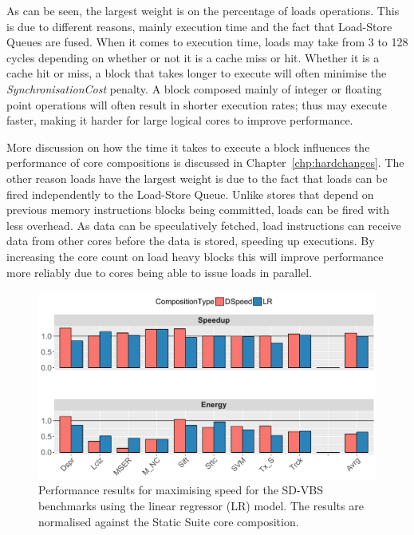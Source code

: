 As can be seen, the largest weight is on the percentage of loads operations.
This is due to different reasons, mainly execution time and the fact that Load-Store Queues are fused.
When it comes to execution time, loads may take from 3 to 128 cycles depending on whether or not it is a cache miss or hit.
Whether it is a cache hit or miss, a block that takes longer to execute will often minimise the \textit{SynchronisationCost} penalty.
A block composed mainly of integer or floating point operations will often result in shorter execution rates; thus may execute faster, making it harder for large logical cores to improve performance.

More discussion on how the time it takes to execute a block influences the performance of core compositions is discussed in Chapter~\ref{chp:hardchanges}.
The other reason loads have the largest weight is due to the fact that loads can be fired independently to the Load-Store Queue.
Unlike stores that depend on previous memory instructions blocks being committed, loads can be fired with less overhead.
As data can be speculatively fetched, load instructions can receive data from other cores before the data is stored, speeding up executions.
By increasing the core count on load heavy blocks this will improve performance more reliably due to cores being able to issue loads in parallel.

\begin{figure}[t]
    \centering
	\includegraphics[width=1\textwidth]{cases-paper/graphics/results/lr_speed3.pdf}
    \caption{Performance results for maximising speed for the SD-VBS benchmarks using the linear regressor (LR) model. The results are normalised against the Static Suite core composition.}%
    \label{fig:speedlr}
	\vspace{1em}
\end{figure}

